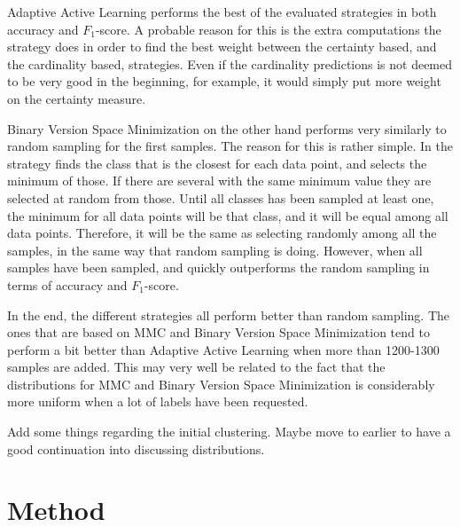 Adaptive Active Learning performs the best of the evaluated strategies in both accuracy and $F_1$-score. 
A probable reason for this is the extra computations the strategy does in order to find the best weight between the certainty based, and the cardinality based, strategies.
Even if the cardinality predictions is not deemed to be very good in the beginning, for example, it would simply put more weight on the certainty measure.

Binary Version Space Minimization on the other hand performs very similarly to random sampling for the first samples.
The reason for this is rather simple.
In the strategy finds the class that is the closest for each data point, and selects the minimum of those.
If there are several with the same minimum value they are selected at random from those.
Until all classes has been sampled at least one, the minimum for all data points will be that class, and it will be equal among all data points.
Therefore, it will be the same as selecting randomly among all the samples, in the same way that random sampling is doing.
However, when all samples have been sampled, and quickly outperforms the random sampling in terms of accuracy and $F_1$-score.

In the end, the different strategies all perform better than random sampling.
The ones that are based on MMC and Binary Version Space Minimization tend to perform a bit better than Adaptive Active Learning when more than 1200-1300 samples are added.
This may very well be related to the fact that the distributions for MMC and Binary Version Space Minimization is considerably more uniform when a lot of labels have been requested.

Add some things regarding the initial clustering. Maybe move to earlier to have a good continuation into discussing distributions.


\section{Method}
\label{sec:discussion-method}

